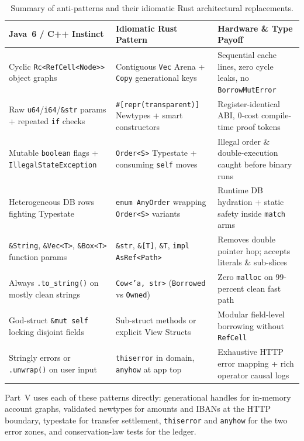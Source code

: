 \begin{table}[H]
\centering
\small
\begin{tabular}{@{}p{4.3cm}p{4.4cm}p{4.9cm}@{}}
\toprule
\textbf{Java~6 / C++ Instinct} & \textbf{Idiomatic Rust Pattern} & \textbf{Hardware \& Type Payoff} \\
\midrule
Cyclic \texttt{Rc<RefCell<Node>>} object graphs & Contiguous \texttt{Vec} Arena + \texttt{Copy} generational keys & Sequential cache lines, zero cycle leaks, no \texttt{BorrowMutError} \\
\addlinespace[3pt]
Raw \texttt{u64}/\texttt{i64}/\texttt{\&str} params + repeated \texttt{if} checks & \texttt{\#[repr(transparent)]} Newtypes + smart constructors & Register-identical ABI, 0-cost compile-time proof tokens \\
\addlinespace[3pt]
Mutable \texttt{boolean} flags + \texttt{IllegalStateException} & \texttt{Order<S>} Typestate + consuming \texttt{self} moves & Illegal order \& double-execution caught before binary runs \\
\addlinespace[3pt]
Heterogeneous DB rows fighting Typestate & \texttt{enum AnyOrder} wrapping \texttt{Order<S>} variants & Runtime DB hydration + static safety inside \texttt{match} arms \\
\addlinespace[3pt]
\texttt{\&String}, \texttt{\&Vec<T>}, \texttt{\&Box<T>} function params & \texttt{\&str}, \texttt{\&[T]}, \texttt{\&T}, \texttt{impl AsRef<Path>} & Removes double pointer hop; accepts literals \& sub-slices \\
\addlinespace[3pt]
Always \texttt{.to\_string()} on mostly clean strings & \texttt{Cow<'a, str>} (\texttt{Borrowed} vs \texttt{Owned}) & Zero \texttt{malloc} on 99-percent clean fast path \\
\addlinespace[3pt]
God-struct \texttt{\&mut self} locking disjoint fields & Sub-struct methods or explicit View Structs & Modular field-level borrowing without \texttt{RefCell} \\
\addlinespace[3pt]
Stringly errors or \texttt{.unwrap()} on user input & \texttt{thiserror} in domain, \texttt{anyhow} at app top & Exhaustive HTTP error mapping + rich operator causal logs \\
\bottomrule
\end{tabular}
\caption{Summary of anti-patterns and their idiomatic Rust architectural replacements.}
\label{ch08:tab-antipatterns}
\end{table}

Part~V uses each of these patterns directly: generational handles for in-memory account graphs, validated newtypes for amounts and IBANs at the HTTP boundary, typestate for transfer settlement, \texttt{thiserror} and \texttt{anyhow} for the two error zones, and conservation-law tests for the ledger.

